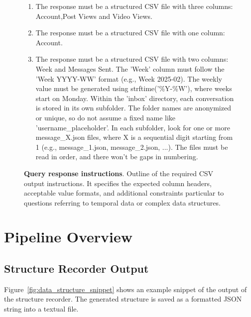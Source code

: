 \documentclass{DESSThesis}
\begin{document}
\begin{figure}[h]
{\begin{minipage}{0.95\linewidth}
\begin{enumerate}[noitemsep, topsep=0pt]
            \item The response must be a structured CSV file with three columns: Account,Post Views and Video Views.
            \item The response must be a structured CSV file with one column: Account.
            \item The response must be a structured CSV file with two columns: Week and Messages Sent. The 'Week' column must follow the 'Week YYYY-WW' format (e.g., Week 2025-02). The weekly value must be generated using strftime('\%Y-\%W'), where weeks start on Monday. Within the 'inbox' directory, each conversation is stored in its own subfolder. The folder names are anonymized or unique, so do not assume a fixed name like 'username\_placeholder'. In each subfolder, look for one or more message\_X.json files, where X is a sequential digit starting from 1 (e.g., message\_1.json, message\_2.json, ...). The files must be read in order, and there won't be gaps in numbering.
        \end{enumerate}
        \end{minipage}
    }
    \caption[Query response instructions]{\textbf{Query response instructions}. Outline of the required CSV output instructions. It specifies the expected column headers, acceptable value formats, and additional constraints particular to questions referring to temporal data or complex data structures.}
    \label{fig:query_response_instructions}
\end{figure}

\newpage

\section{Pipeline Overview}

\subsection{Structure Recorder Output}

Figure~\ref{fig:data_structure_snippet} shows an example snippet of the output of the structure recorder. The generated structure is saved as a formatted JSON string into a textual file.
\end{document}
